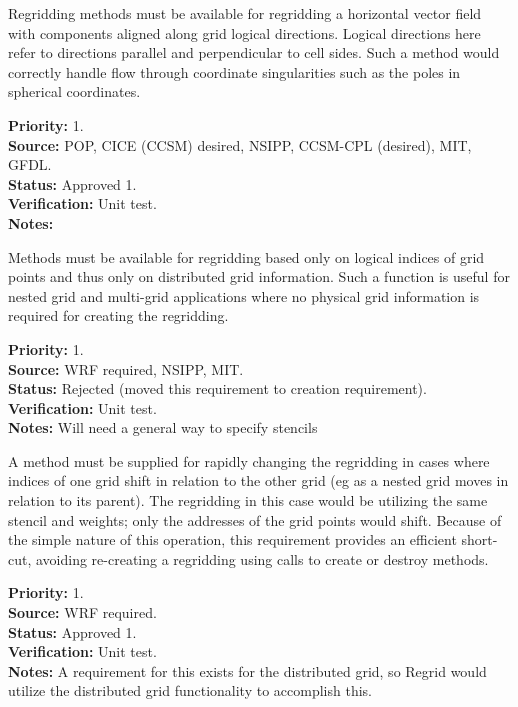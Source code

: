Regridding methods must be available for regridding a horizontal
vector field with components aligned along grid logical directions.
Logical directions here refer to directions parallel and perpendicular
to cell sides.  Such a method would correctly handle flow through 
coordinate singularities such as the poles in spherical coordinates.

\begin{reqlist}
{\bf Priority:} 1. \\
{\bf Source:}  POP, CICE (CCSM) desired, NSIPP, CCSM-CPL (desired), MIT, GFDL. \\
{\bf Status:} Approved 1. \\
{\bf Verification:} Unit test. \\
{\bf Notes:} 
\end{reqlist}


Methods must be available for regridding based only on logical indices of 
grid points and thus only on distributed grid information.  
Such a function is useful for nested grid and multi-grid applications where 
no physical grid information is required for creating the regridding.

\begin{reqlist}
{\bf Priority:} 1. \\
{\bf Source:}  WRF required, NSIPP, MIT. \\
{\bf Status:} Rejected (moved this requirement to creation requirement). \\
{\bf Verification:} Unit test. \\
{\bf Notes:} Will need a general way to specify stencils
\end{reqlist}


A method must be supplied for rapidly changing the
regridding in cases where indices of one grid shift in relation 
to the other grid (eg as a nested grid moves in relation to its 
parent).  The regridding in this case would be utilizing the
same stencil and weights; only the addresses of the grid points
would shift.  Because of the simple nature of this operation,
this requirement provides an efficient short-cut, avoiding
re-creating a regridding using calls to create or destroy methods.

\begin{reqlist}
{\bf Priority:} 1. \\
{\bf Source:}  WRF required. \\
{\bf Status:} Approved 1. \\
{\bf Verification:} Unit test. \\
{\bf Notes:} A requirement for this exists for the distributed grid, so
             Regrid would utilize the distributed grid functionality to 
             accomplish this.
\end{reqlist}

